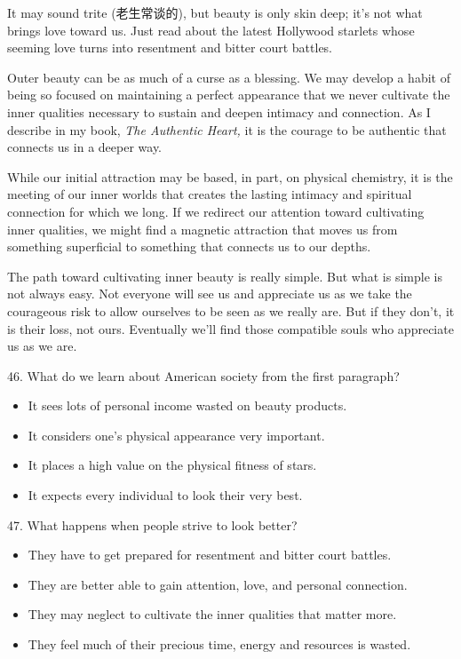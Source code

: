 \documentclass[UTF8,11pt]{ctexart}
\begin{document}
It may sound trite (老生常谈的), but beauty is only skin deep; it’s not what brings love toward us. Just read about the latest Hollywood starlets whose seeming love turns into resentment and bitter court battles.


Outer beauty can be as much of a curse as a blessing. We may develop a habit of being so focused on maintaining a perfect appearance that we never cultivate the inner qualities necessary to sustain and deepen intimacy and connection. As I describe in my book, \textit{The Authentic Heart,} it is the courage to be authentic that connects us in a deeper way.


While our initial attraction may be based, in part, on physical chemistry, it is the meeting of our inner worlds that creates the lasting intimacy and spiritual connection for which we long. If we redirect our attention toward cultivating inner qualities, we might find a magnetic attraction that moves us from something superficial to something that connects us to our depths.


The path toward cultivating inner beauty is really simple. But what is simple is not always easy. Not everyone will see us and appreciate us as we take the courageous risk to allow ourselves to be seen as we really are. But if they don’t, it is their loss, not ours. Eventually we’ll find those compatible souls who appreciate us as we are.


46. What do we learn about American society from the first paragraph?


\begin{itemize}[leftmargin=2em,itemsep=.2em,topsep=.4em]\item[A.] It sees lots of personal income wasted on beauty products.
\item[B.] It considers one’s physical appearance very important.
\item[C.] It places a high value on the physical fitness of stars.
\item[D.] It expects every individual to look their very best.
\end{itemize}

47. What happens when people strive to look better?


\begin{itemize}[leftmargin=2em,itemsep=.2em,topsep=.4em]\item[A.] They have to get prepared for resentment and bitter court battles.
\item[B.] They are better able to gain attention, love, and personal connection.
\item[C.] They may neglect to cultivate the inner qualities that matter more.
\item[D.] They feel much of their precious time, energy and resources is wasted.
\end{itemize}
\end{document}
